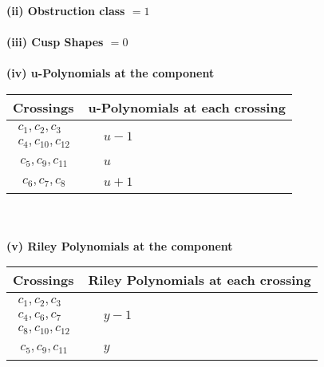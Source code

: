 \documentclass[1p]{elsarticle_modified}
\theoremstyle{definition}
\begin{document}
\flushleft \textbf{(ii) Obstruction class $= 1$}\\~\\
\flushleft \textbf{(iii) Cusp Shapes $= 0$}\\~\\
\newpage\renewcommand{\arraystretch}{1}
\flushleft \textbf{(iv) u-Polynomials at the component}\newline \\
\begin{tabular}{m{50pt}|m{274pt}}
Crossings & \hspace{64pt}u-Polynomials at each crossing \\
\hline $$\begin{aligned}c_{1},c_{2},c_{3}\\c_{4},c_{10},c_{12}\end{aligned}$$&$\begin{aligned}
&u-1
\end{aligned}$\\
\hline $$\begin{aligned}c_{5},c_{9},c_{11}\end{aligned}$$&$\begin{aligned}
&u
\end{aligned}$\\
\hline $$\begin{aligned}c_{6},c_{7},c_{8}\end{aligned}$$&$\begin{aligned}
&u+1
\end{aligned}$\\
\hline
\end{tabular}\\~\\
\newpage\renewcommand{\arraystretch}{1}
\flushleft \textbf{(v) Riley Polynomials at the component}\newline \\
\begin{tabular}{m{50pt}|m{274pt}}
Crossings & \hspace{64pt}Riley Polynomials at each crossing \\
\hline $$\begin{aligned}c_{1},c_{2},c_{3}\\c_{4},c_{6},c_{7}\\c_{8},c_{10},c_{12}\end{aligned}$$&$\begin{aligned}
&y-1
\end{aligned}$\\
\hline $$\begin{aligned}c_{5},c_{9},c_{11}\end{aligned}$$&$\begin{aligned}
&y
\end{aligned}$\\
\hline
\end{tabular}\\~\\
\end{document}
